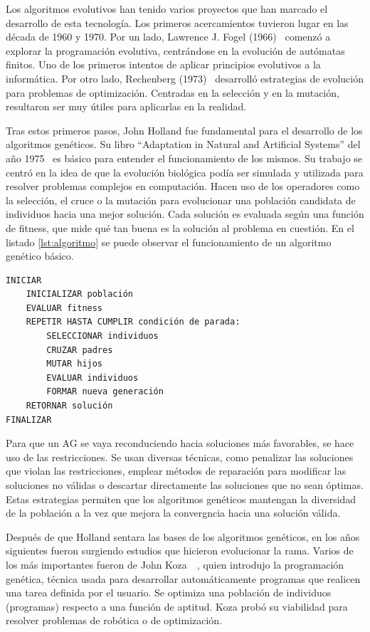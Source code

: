 Los algoritmos evolutivos han tenido varios proyectos que han marcado el desarrollo de esta tecnología. Los primeros acercamientos tuvieron lugar en las década de 1960 y 1970. Por un lado, Lawrence J. Fogel (1966)~\cite{fogel1966} comenzó a explorar la programación evolutiva, centrándose en la evolución de autómatas finitos. Uno de los primeros intentos de aplicar principios evolutivos a la informática. Por otro lado, Rechenberg (1973)~\cite{rechenberg1973} desarrolló estrategias de evolución para problemas de optimización. Centradas en la selección y en la mutación, resultaron ser muy útiles para aplicarlas en la realidad.

Tras estos primeros pasos, John Holland fue fundamental para el desarrollo de los algoritmos genéticos. Su libro ``Adaptation in Natural and Artificial Systems'' del año 1975~\cite{holland1975} es básico para entender el funcionamiento de los mismos. Su trabajo se centró en la idea de que la evolución biológica podía ser simulada y utilizada para resolver problemas complejos en computación. Hacen uso de los operadores como la selección, el cruce o la mutación para evolucionar una población candidata de individuos hacia una mejor solución. Cada solución es evaluada según una función de fitness, que mide qué tan buena es la solución al problema en cuestión. En el listado \ref{lst:algoritmo} se puede observar el funcionamiento de un algoritmo genético básico.

\begin{lstlisting}[caption=Algoritmo genético., label={lst:algoritmo}]
INICIAR
    INICIALIZAR población
    EVALUAR fitness
    REPETIR HASTA CUMPLIR condición de parada:
        SELECCIONAR individuos
        CRUZAR padres
        MUTAR hijos
        EVALUAR individuos
        FORMAR nueva generación
    RETORNAR solución
FINALIZAR
\end{lstlisting}

Para que un AG se vaya reconduciendo hacia soluciones más favorables, se hace uso de las restricciones. Se usan diversas técnicas, como penalizar las soluciones que violan las restricciones, emplear métodos de reparación para modificar las soluciones no válidas o descartar directamente las soluciones que no sean óptimas. Estas estrategias permiten que los algoritmos genéticos mantengan la diversidad de la población a la vez que mejora la convergncia hacia una solución válida.

Después de que Holland sentara las bases de los algoritmos genéticos, en los años siguientes fueron surgiendo estudios que hicieron evolucionar la rama. Varios de los más importantes fueron de John Koza~\cite{koza1992}~\cite{koza1994}, quien introdujo la programación genética, técnica usada para desarrollar automáticamente programas que realicen una tarea definida por el usuario. Se optimiza una población de individuos (programas) respecto a una función de aptitud. Koza probó su viabilidad para resolver problemas de robótica o de optimización.

